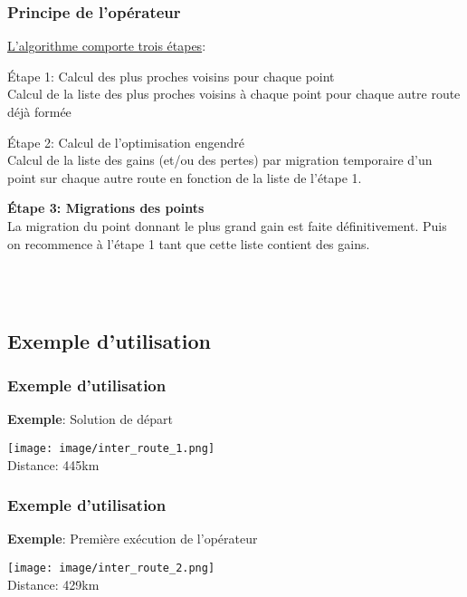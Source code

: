 \documentclass[10pt]{beamer}
\begin{document}
	\begin{frame}
		\frametitle{Principe de l'opérateur}
		\underline{L'algorithme comporte trois étapes}:
		\begin{itemize}[label=—]
			\small{\item Étape 1: Calcul des plus proches voisins pour chaque point
			\  \\ Calcul de la liste des plus proches voisins à chaque point pour chaque autre route déjà formée 
			\item Étape 2: Calcul de l'optimisation engendré
			\  \\ Calcul de la liste des gains (et/ou des pertes) par migration temporaire d'un point sur chaque autre route en fonction de la liste de l'étape 1.
			\item \textbf{Étape 3: Migrations des points}
			\  \\ La migration du point donnant le plus grand gain est faite définitivement. Puis on recommence à l'étape 1 tant que cette liste contient des gains.} \\ \  \\
		\end{itemize}	
	\end{frame}

	\subsection{Exemple d'utilisation}

	\begin{frame}
		\frametitle{Exemple d'utilisation}
		\begin{exampleblock}{\textbf{Exemple}: Solution de départ}
			\begin{center}
				\texttt{[image: image/inter\_route\_1.png]}  \\
				Distance: 445km
			\end{center}
		\end{exampleblock}
	\end{frame}

	\begin{frame}
		\frametitle{Exemple d'utilisation}
		\begin{exampleblock}{\textbf{Exemple}: Première exécution de l'opérateur}
			\begin{center}
				\texttt{[image: image/inter\_route\_2.png]}  \\
				Distance: 429km
			\end{center}
		\end{exampleblock}
	\end{frame}
\end{document}
